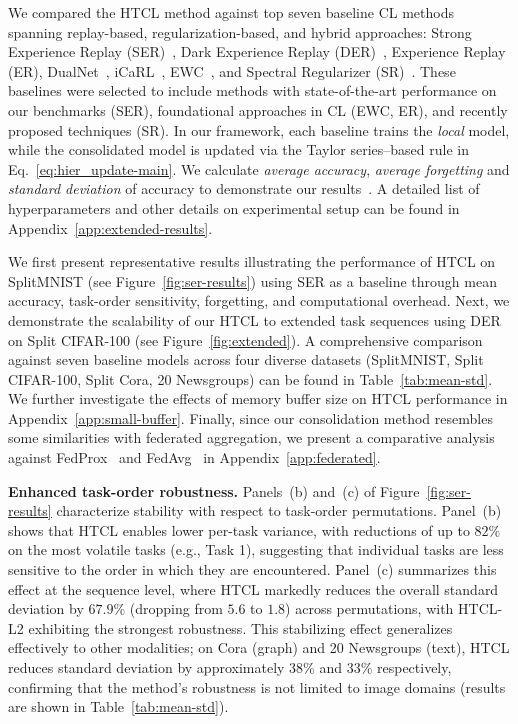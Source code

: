 We compared the HTCL method against top seven baseline CL methods spanning replay-based, regularization-based, and hybrid approaches: Strong Experience Replay (SER)~\cite{zhuo2023continual}, Dark Experience Replay (DER)~\cite{buzzega2020dark}, Experience Replay (ER), DualNet~\cite{pham2021dualnet}, iCaRL~\cite{rebuffi2017icarl}, EWC~\cite{kirkpatrick2017overcoming}, and Spectral Regularizer (SR)~\cite{ICLR2025_5565ab68}. These baselines were selected to include methods with state-of-the-art performance on our benchmarks (SER), foundational approaches in CL (EWC, ER), and recently proposed techniques (SR). In our framework, each baseline trains the \textit{local} model, while the consolidated model is updated via the Taylor series–based rule in Eq.~\eqref{eq:hier_update-main}. We calculate \textit{average accuracy}, \textit{average forgetting} and \textit{standard deviation} of accuracy to demonstrate our results~\cite{lopez2017gradient, chaudhry2018efficient}. A detailed list of hyperparameters and other details on experimental setup can be found in Appendix~\ref{app:extended-results}.

We first present representative results illustrating the performance of HTCL on SplitMNIST (see Figure~\ref{fig:ser-results}) using SER as a baseline through mean accuracy, task-order sensitivity, forgetting, and computational overhead. Next, we demonstrate the scalability of our HTCL to extended task sequences using DER on Split CIFAR-100 (see Figure~\ref{fig:extended}). A comprehensive comparison against seven baseline models across four diverse datasets (SplitMNIST, Split CIFAR-100, Split Cora, 20 Newsgroups) can be found in Table~\ref{tab:mean-std}. We further investigate the effects of memory buffer size on HTCL performance in Appendix~\ref{app:small-buffer}. Finally, since our consolidation method resembles some similarities with federated aggregation, we present a comparative analysis against FedProx~\cite{li2020federated} and FedAvg~\cite{mcmahan2017communication} in Appendix~\ref{app:federated}.

\textbf{Enhanced task-order robustness.} Panels~(b) and~(c)  of Figure~\ref{fig:ser-results} characterize stability with respect to task-order permutations. Panel~(b) shows that HTCL enables lower per-task variance, with reductions of up to $82\%$ on the most volatile tasks (e.g., Task 1), suggesting that individual tasks are less sensitive to the order in which they are encountered. Panel~(c) summarizes this effect at the sequence level, where HTCL markedly reduces the overall standard deviation by $67.9\%$ (dropping from $5.6$ to $1.8$) across permutations, with HTCL-L2 exhibiting the strongest robustness. This stabilizing effect generalizes effectively to other modalities; on Cora (graph) and 20 Newsgroups (text), HTCL reduces standard deviation by approximately $38\%$ and $33\%$ respectively, confirming that the method's robustness is not limited to image domains (results are shown in Table~\ref{tab:mean-std}).

